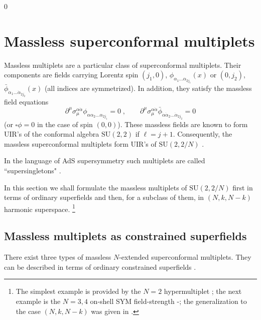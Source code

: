 \documentclass[a4paper,12pt]{article}
\begin{document}
\setcounter{equation}0 
\section{Massless superconformal multiplets}\label{masup} 


Massless multiplets are a particular class of superconformal 
multiplets. Their components are fields carrying Lorentz spin 
$(j_1,0)$, $\phi_{\alpha_1\ldots\alpha_{2j_1}}(x)$ or $(0,j_2)$,  
$\bar\phi_{\dot\alpha_1\ldots\dot\alpha_{2j_2}}(x)$ (all indices 
are symmetrized). In addition, they satisfy the massless field 
equations 
\begin{equation}\label{4.0}
\partial^\mu 
\sigma_\mu^{\alpha\dot\alpha}\phi_{\alpha\alpha_2\ldots\alpha_{2j_1}} 
= 0\;, \qquad \partial^\mu 
\sigma_\mu^{\alpha\dot\alpha}
\bar\phi_{\dot\alpha\dot\alpha_2\ldots\dot\alpha_{2j_2}} 
=0 
\end{equation}
(or $\square \phi = 0$ in the case of spin $(0,0)$). These 
massless fields are known \cite{BFH} to form UIR's of the 
conformal algebra $\mbox{SU}(2,2)$ if $\ell=j+1$. Consequently, 
the massless superconformal multiplets form UIR's of 
$\mbox{SU}(2,2/N)$ \cite{dp,bin}. 

In the language of AdS supersymmetry such multiplets are called 
``supersingletons" \cite{NS,GW}. 

In this section we shall formulate the massless multiplets of 
$\mbox{SU}(2,2/N)$ first in terms of ordinary superfields and 
then, for a subclass of them, in $(N,k,N-k)$ harmonic superspace. 
\footnote{The simplest example is provided by the $N=2$ 
hypermultiplet \cite{GIK1}; the next example is the $N=3,4$ 
on-shell SYM field-strength \cite{GIK2}-\cite{Bandos}; the 
generalization to the case $(N,k,N-k)$ was given in \cite{hh}.} 


\subsection{Massless multiplets as constrained superfields}

There exist three types of massless $N$-extended superconformal 
multiplets. They can be described in terms of ordinary constrained 
superfields \cite{Siegel,HST}.  
\end{document}
